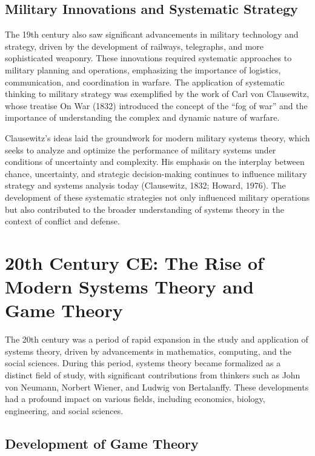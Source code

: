 \documentclass[twocolumn]{article}
\begin{document}
\subsection{Military Innovations and Systematic Strategy}

\textcolor{primary}{The 19th century also saw significant advancements in military technology and strategy, driven by the development of railways, telegraphs, and more sophisticated weaponry. These innovations required systematic approaches to military planning and operations, emphasizing the importance of logistics, communication, and coordination in warfare. The application of systematic thinking to military strategy was exemplified by the work of Carl von Clausewitz, whose treatise On War (1832) introduced the concept of the “fog of war” and the importance of understanding the complex and dynamic nature of warfare.}

\textcolor{secondary}{Clausewitz’s ideas laid the groundwork for modern military systems theory, which seeks to analyze and optimize the performance of military systems under conditions of uncertainty and complexity. His emphasis on the interplay between chance, uncertainty, and strategic decision-making continues to influence military strategy and systems analysis today (Clausewitz, 1832; Howard, 1976). The development of these systematic strategies not only influenced military operations but also contributed to the broader understanding of systems theory in the context of conflict and defense.}


\section{20th Century CE: The Rise of Modern Systems Theory and Game Theory}

\textcolor{primary}{The 20th century was a period of rapid expansion in the study and application of systems theory, driven by advancements in mathematics, computing, and the social sciences. During this period, systems theory became formalized as a distinct field of study, with significant contributions from thinkers such as John von Neumann, Norbert Wiener, and Ludwig von Bertalanffy. These developments had a profound impact on various fields, including economics, biology, engineering, and social sciences.}

\subsection{Development of Game Theory}
\end{document}
